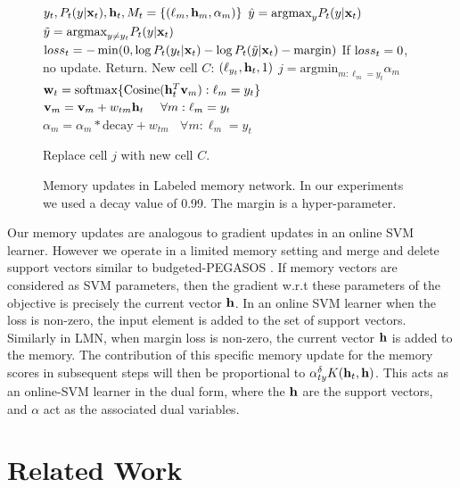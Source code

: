 \documentclass[letterpaper]{article} %
\newcommand{\vek}[1]{{\bf {#1}}}
\newcommand{\vx}{{\vek{x}}}
\newcommand{\vw}{{\vek{w}}}
\newcommand{\vh}{{\vek{h}}}
\newcommand{\vM}{{\vek{v}}}
\newcommand{\argmax}{{\text{argmax}}}
\newcommand{\argmin}{{\text{argmin}}}
\newcommand{\loss}{{\text loss}}
\begin{document}
\begin{figure}
\begin{center}
\begin{algorithmic}
 $y_t, P_t(y|\vx_t), \vh_t, M_t = \{(\ell_m, \vh_m, \alpha_m)\}$
\STATE $\hat{y} = \argmax_y P_t(y|\vx_t)$
\STATE $\tilde{y} = \argmax_{y \neq y_t} P_t(y|\vx_t)$
\STATE $\loss_t = - \min(0, \log P_t(y_t|\vx_t) - \log P_t(\tilde{y}|\vx_t) - \text{margin} )$
\STATE If $\loss_t=0$, no update. Return.
\STATE New cell $C$: $(\ell_{y_t}, \vh_t, 1)$
\STATE $j = \argmin_{m:\ell_m = y_t} \alpha_m$
\STATE $\vw_t = \text{softmax}\{\text{Cosine}(\vh_t^T \vM_m) :\ell_m = y_t\}$
\STATE $\vM_{m} = \vM_{m} + w_{tm}{\vh_t}~~~~\forall m: \ell_m = y_t$
\STATE $\alpha_{m} = \alpha_m*\text{decay} + w_{tm}~~~~\forall m: \ell_m = y_t$

\STATE Replace cell $j$ with new cell $C$.
\ENDIF
\end{algorithmic}
\caption{\label{alg-write}Memory updates in Labeled memory network. In our experiments we used a decay value of 0.99.   The margin is a hyper-parameter.}
\end{center}
\end{figure}

Our memory updates are analogous to gradient updates in an online SVM learner. However we operate in a limited memory setting and merge and delete support vectors similar to budgeted-PEGASOS \cite{WangCV10}. If memory vectors are considered as SVM parameters, then the gradient w.r.t these parameters of the objective is precisely the current vector $\bf{h}$. In an online SVM learner when the loss is non-zero, the input element is added to the set of support vectors. Similarly in LMN, when margin loss is non-zero, the current vector $\bf{h}$ is added to the memory. The contribution of this specific memory update for the memory scores in subsequent steps will then be proportional to $\alpha_{ty}^\delta K(\vh_t, \bf{h})$. This acts as an online-SVM learner in the dual form, where the $\bf{h}$ are the support vectors, and $\alpha$ act as the associated dual variables.





\section{Related Work}
\end{document}

